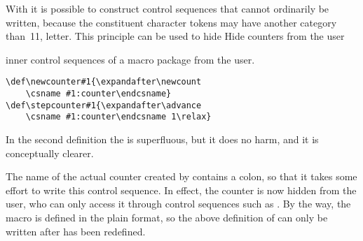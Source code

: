 \documentclass[letterpaper]{book}
\begin{document}
With  it is possible to construct
control sequences that cannot ordinarily be written,
because the constituent character tokens may have another category
\alt
than~11, letter. This principle can be used to hide
\howto Hide counters from the user\par
inner control sequences of a macro package from the user.
\begin{example}
\begin{verbatim}
\def\newcounter#1{\expandafter\newcount
    \csname #1:counter\endcsname}
\def\stepcounter#1{\expandafter\advance
    \csname #1:counter\endcsname 1\relax}
\end{verbatim}
In the second definition the  is superfluous,
but it does no harm, and it is conceptually clearer.
\end{example}

The name of the actual counter created by 
contains a colon, so that it takes some effort to write this
control sequence. In effect, the counter
is now hidden from the user, who can only
access it through control sequences such as .
By the way, the macro  is defined  in
the plain format, so the above definition of 
can only be written after  has been redefined.
\end{document}
